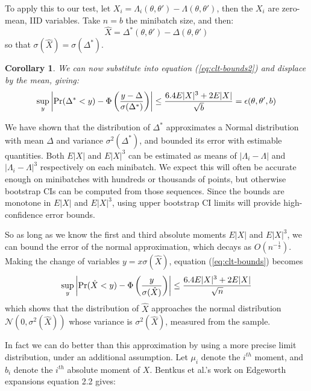 \documentclass{article}
\newtheorem{corollary}{Corollary}
\begin{document}
To apply this to our test, let $X_i = \Lambda_i(\theta,\theta') - \Lambda(\theta,\theta')$,
then the $X_i$ are zero-mean, IID variables.
Take $n=b$ the minibatch size, and then:
\begin{equation}
\hat{X} = \Delta^*(\theta,\theta') - \Delta(\theta,\theta') 
\end{equation}
so that $\sigma(\hat{X}) = \sigma(\Delta^*)$.
\begin{corollary}
  We can now substitute into equation (\ref{eq:clt-bounds2}) and displace by the mean, giving:
\begin{equation}\label{eq:clt-bounds3}
   \sup_y\left|{\rm Pr}(\Delta^*< y) - \Phi\left(\frac{y-\Delta}{\sigma(\Delta^*)}\right)\right| \leq \frac{6.4E|X|^3+2E|X|}{\sqrt{b}} = \epsilon(\theta,\theta',b)
\end{equation}
\end{corollary}

We have shown that the distribution of $\Delta^*$ approximates a
Normal distribution with mean $\Delta$ and variance
$\sigma^2(\Delta^*)$, and bounded its error with estimable
quantities. Both $E|X|$ and $E|X|^3$ can be estimated as means of
$|\Lambda_i - \Lambda|$ and $|\Lambda_i - \Lambda|^3$ respectively on each minibatch. We expect this
will often be accurate enough on minibatches with hundreds or
thousands of points, but otherwise bootstrap CIs can be computed from
those sequences. Since the bounds are monotone in $E|X|$ and $E|X|^3$,
using upper bootstrap CI limits will provide high-confidence error bounds.

So as long as we know the first and third absolute moments $E|X|$ and $E|X|^3$, we can bound the
error of the normal approximation, which decays as $O(n^{-\frac{1}{2}})$. Making the change of variables
$y = x \sigma(\hat{X})$, equation (\ref{eq:clt-bounds}) becomes
\begin{equation}\label{eq:clt-bounds2}
   \sup_y\left|{\rm Pr}(\hat{X}< y) - \Phi\left(\frac{y}{\sigma(\hat{X})}\right)\right| \leq \frac{6.4E|X|^3+2E|X|}{\sqrt{n}}
\end{equation}
which shows that the distribution of $\hat{X}$ approaches the normal distribution $\mathcal{N}(0,\sigma^2(\hat{X}))$
whose variance is $\sigma^2(\hat{X})$, measured from the sample.


In fact we can do better than this approximation by using a more
precise limit distribution, under an additional assumption. Let $\mu_i$ denote the $i^{th}$ moment, and $b_i$
denote the $i^{th}$ absolute moment of $X$. Bentkus et al.'s work on Edgeworth
expansions \cite{Bentkus97} equation 2.2 gives:
\end{document}
